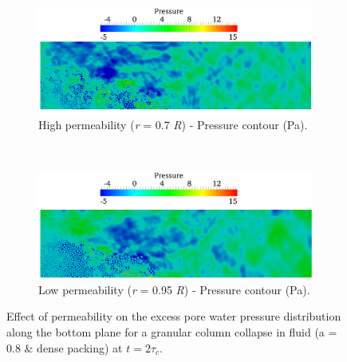 \begin{figure}
\ContinuedFloat
\begin{subfigure}[t]{0.975\textwidth}
	\centering
    \includegraphics[width=\textwidth]{a08/r07_PWP_flow_press_dense}
    \caption{High permeability (\textit{r} = 0.7 \textit{R}) - Pressure contour 
    (Pa).}
    \label{fig:r07_PWPress_flow_dense}
\end{subfigure}
\\
\begin{subfigure}[t]{0.975\textwidth}
	\centering
    \includegraphics[width=\textwidth]{a08/r095_PWP_flow_press_dense}
    \caption{Low permeability (\textit{r} = 0.95 \textit{R}) - Pressure contour 
    (Pa).}
    \label{fig:r095_PWPress_flow_dense}
\end{subfigure}
\caption{Effect of permeability on the excess pore water pressure distribution 
along the bottom plane for a granular column collapse in fluid (a = 0.8 \& 
dense packing) at $t = 2\tau_c$.}
\label{fig:PWP_flow_dense}
\end{figure}

